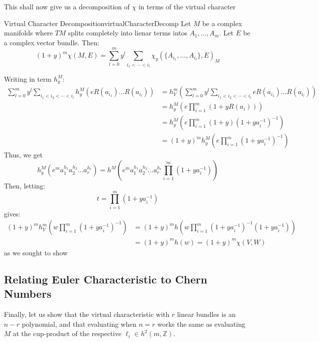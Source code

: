 \documentclass{book}
\newenvironment{Proof}[1][]
  {\begin{ProofTcb}[#1]}
  {\end{ProofTcb}}
\newcommand{\Z}{{\mathbb{Z}}}
\begin{document}
This shall now give us a decomposition of $\chi$ in terms of the virtual character

\begin{thm}{Virtual Character Decomposition}{virtualCharacterDecomp}
  Let $M$ be a complex manifolds where $TM$ splits completely into lienar terms intos $A_1, ..., A_m$. Let $E$
  be a complex vector bundle. Then:
  \[
    (1+y)^m \chi(M, E) = \sum_{l=0}^m y^l \sum_{i_1 < \cdots < i_l} \chi_y(\{A_{i_1}, ..., A_{i_l}\}, E)_M
  \]
\end{thm}

\begin{Proof}
    Writing in term $h_y^M$:
  \begin{align*}
      \sum_{l=0}^m y^l \sum_{i_1<i_2<\cdots<i_l} h_y^M(eR(a_{i_1})\ldots R(a_{i_l})) &= h_Y^m\left(\sum_{l=0}^m y^l \sum_{i_1<i_2<\cdots<i_l} eR(a_{i_1})\ldots R(a_{i_l})\right) \\
      &= h_y^M\left(e\prod_{i=1}^m(1+yR(a_i))\right) \\
      &= h_y^M\left(e\prod_{i=1}^m(1+y)(1+ya_i^{-1})^{-1}\right) \\
      &= (1+y)^mh_y^M\left(e\prod_{i=1}^m(1+ya_i^{-1})^{-1}\right)
  \end{align*}
  Thus, we get
  \[
      h_y^M(e^m a_1^{h_1}a_2^{h_2}\ldots a_r^{h_r}) = h^M\left(e^m a_1^{h_1}a_2^{h_2}\ldots a_r^{h_r}\prod_{i=1}^m(1+ya_i^{-1})\right)
  \]
  Then, letting:
  \[
      t = \prod_{i=1}^m(1+ya_i^{-1})
  \]
  gives:
  \begin{align*}
      (1+y)^mh_Y^m\left(w\prod_{i=1}^m(1+ya_i^{-1})^{-1}\right) &= (1+y)^mh\left(w\prod_{i=1}^m(1+ya_i^{-1})^{-1}(1+ya_i^{-1})\right) \\
      &= (1+y)^mh(w) = (1+y)^m\chi(V,W)
  \end{align*}
  as we sought to show
\end{Proof}






\subsection{Relating Euler Characteristic to Chern Numbers}\label{sec:virtualEulerCharOnProjVar}

Finally, let us show that the virtual characteristic with $r$ linear bundles is an $n-r$ polynomial, and that
evaluating when $n=r$ works the same as evaluating $M$ at the cup-product of the respective $\ell_i \in h^2(m
,\Z)$.
\end{document}
